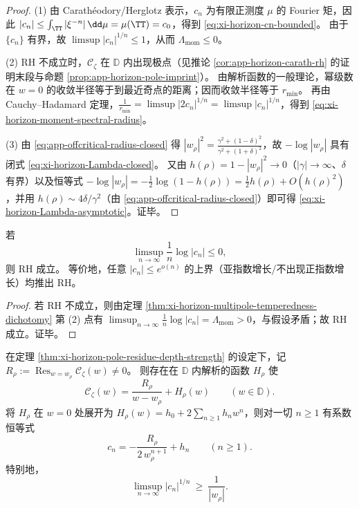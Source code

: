 \begin{proof}
(1) 由 Carath\'eodory/Herglotz 表示，\(c_n\) 为有限正测度 \(\mu\) 的 Fourier 矩，因此
\(
|c_n|\le \int_{\TT}|\xi^{-n}|\,\dd\mu=\mu(\TT)=c_0
\)，得到 \eqref{eq:xi-horizon-cn-bounded}。
由于 \(\{c_n\}\) 有界，故 \(\limsup |c_n|^{1/n}\le 1\)，从而 \(\Lambda_{\mathrm{mom}}\le 0\)。
\par
(2) RH 不成立时，\(\mathscr{C}_{\zeta}\) 在 \(\mathbb{D}\) 内出现极点（见推论 \ref{cor:app-horizon-carath-rh} 的证明末段与命题 \ref{prop:app-horizon-pole-imprint}）。
由解析函数的一般理论，幂级数在 \(w=0\) 的收敛半径等于到最近奇点的距离；因而收敛半径等于 \(r_{\min}\)。
再由 Cauchy--Hadamard 定理，\(\frac{1}{r_{\min}}=\limsup |2c_n|^{1/n}=\limsup |c_n|^{1/n}\)，得到 \eqref{eq:xi-horizon-moment-spectral-radius}。
\par
(3) 由 \eqref{eq:app-offcritical-radius-closed} 得
\(
|w_{\rho}|^2=\frac{\gamma^2+(1-\delta)^2}{\gamma^2+(1+\delta)^2}
\)，故 \(-\log|w_{\rho}|\) 具有闭式 \eqref{eq:xi-horizon-Lambda-closed}。
又由 \(h(\rho)=1-|w_{\rho}|^2\to 0\)（\(|\gamma|\to\infty\)、\(\delta\) 有界）以及恒等式
\(
-\log|w_{\rho}|=-\tfrac12\log(1-h(\rho))
=\tfrac12 h(\rho)+O(h(\rho)^2)
\)，并用 \(h(\rho)\sim 4\delta/\gamma^2\)（由 \eqref{eq:app-offcritical-radius-closed}）即可得 \eqref{eq:xi-horizon-Lambda-asymptotic}。证毕。
\end{proof}

\begin{corollary}\label{cor:xi-horizon-subexp-growth-implies-rh}
若
\[
\limsup_{n\to\infty}\frac{1}{n}\log|c_n|\le 0,
\]
则 RH 成立。
等价地，任意 \( |c_n|\le e^{o(n)} \) 的上界（亚指数增长/不出现正指数增长）均推出 RH。
\end{corollary}

\begin{proof}
若 RH 不成立，则由定理 \ref{thm:xi-horizon-multipole-temperedness-dichotomy} 第 (2) 点有
\(
\limsup_{n\to\infty}\frac{1}{n}\log|c_n|
=\Lambda_{\mathrm{mom}}>0
\)，与假设矛盾；故 RH 成立。证毕。
\end{proof}

\begin{theorem}[单一离线极点对多极矩的强迫几何尾项]\label{thm:xi-horizon-forced-geometric-tail}
在定理 \ref{thm:xi-horizon-pole-residue-depth-strength} 的设定下，记
\(
R_{\rho}:=\operatorname*{Res}_{w=w_{\rho}}\mathscr{C}_{\zeta}(w)
\neq 0
\)。
则存在在 \(\mathbb{D}\) 内解析的函数 \(H_{\rho}\) 使
\begin{equation}\label{eq:xi-horizon-pole-decomposition}
\boxed{\;
\mathscr{C}_{\zeta}(w)=\frac{R_{\rho}}{w-w_{\rho}}+H_{\rho}(w)\qquad(w\in\mathbb{D}).\;}
\end{equation}
将 \(H_{\rho}\) 在 \(w=0\) 处展开为 \(H_{\rho}(w)=h_0+2\sum_{n\ge 1}h_n w^n\)，则对一切 \(n\ge 1\) 有系数恒等式
\begin{equation}\label{eq:xi-horizon-cn-forced-tail}
\boxed{\;
c_n=-\frac{R_{\rho}}{2\,w_{\rho}^{n+1}}+h_n\qquad(n\ge 1).\;}
\end{equation}
特别地，
\[
\limsup_{n\to\infty}|c_n|^{1/n}\ \ge\ \frac{1}{|w_{\rho}|}.
\]
\end{theorem}

